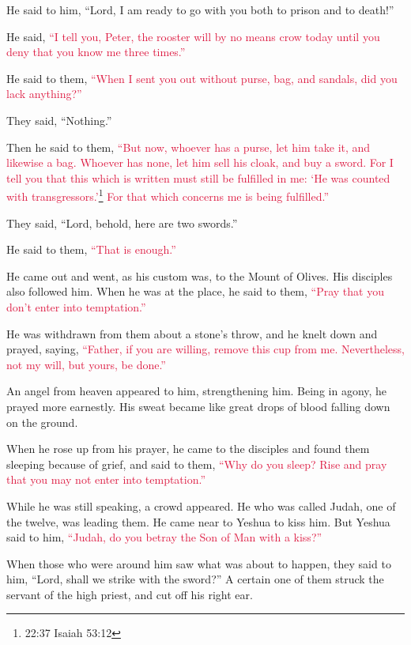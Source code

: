 \myverse{}He said to him, “Lord, I am ready to go with you both to prison
and to death!”

\myverse{}He said,
\textcolor{crimson}{“I tell you, Peter, the rooster will by no means crow today until you deny that you know me three
	times.”}

\myverse{}He said to them,
\textcolor{crimson}{“When I sent you out without purse, bag, and sandals, did you lack anything?”}

They said, “Nothing.”

\myverse{}Then he said to them,
\textcolor{crimson}{“But now, whoever has a purse, let him take it, and likewise a bag. Whoever has none, let him sell
	his cloak, and buy a sword.
}
\myverse{}\textcolor{crimson}{For I tell you that this which is written must still be fulfilled in
	me: ‘He was counted with transgressors.’}\footnote{ 22:37 Isaiah 53:12}
\textcolor{crimson}{For that which concerns me is being fulfilled.”}

\myverse{}They said, “Lord, behold, here are two swords.”

He said to them,
\textcolor{crimson}{“That is enough.”}

\myverse{}He came out and went, as his custom was, to the Mount of Olives.
His disciples also followed him.
\myverse{}When he was at the place, he said to them,
\textcolor{crimson}{“Pray that you don’t enter into temptation.”}

\myverse{}He was withdrawn from them about a stone’s throw, and he knelt
down and prayed,
\myverse{}saying,
\textcolor{crimson}{“Father, if you are willing, remove this cup from me. Nevertheless, not my will, but yours, be done.”}

\myverse{}An angel from heaven appeared to him, strengthening him.
\myverse{}Being in agony, he prayed more earnestly. His sweat became like great drops
of blood falling down on the ground.

\myverse{}When he rose up from his prayer, he came to the disciples and
found them sleeping because of grief,
\myverse{}and said to them,
\textcolor{crimson}{“Why do you sleep? Rise and pray that you may not enter into temptation.”}

\myverse{}While he was still speaking, a crowd appeared. He who was called
Judah, one of the twelve, was leading them. He came near to Yeshua to kiss him.
\myverse{}But Yeshua said to him,
\textcolor{crimson}{“Judah, do you betray the Son of Man with a kiss?”}

\myverse{}When those who were around him saw what was about to happen,
they said to him, “Lord, shall we strike with the sword?”
\myverse{}A certain one of them struck the servant of the high priest, and cut off
his right ear.

